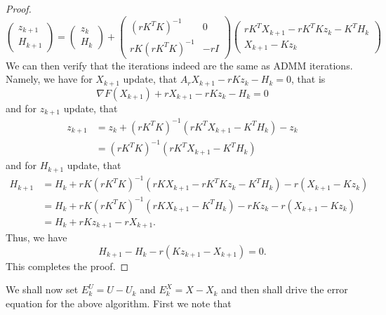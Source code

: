\begin{proof}
\begin{equation}
    \begin{pmatrix}
    z_{k+1}\\
    H_{k+1}
    \end{pmatrix} = \begin{pmatrix}
    z_{k}\\H_{k}
    \end{pmatrix} + \begin{pmatrix}
    (r K^T K)^{-1} & 0 \\
   r K (r K^T K)^{-1} & -r I
    \end{pmatrix} \begin{pmatrix}
     r K^T X_{k+1} - r K^T K z_k - K^T H_k\\
     X_{k+1} - Kz_k
    \end{pmatrix}
\end{equation}
We can then verify that the iterations indeed are the same as ADMM iterations. Namely, we have for $X_{k+1}$ update, that $A_r X_{k+1} - r Kz_{k} - H_k = 0 $, that is 
\begin{equation}
\nabla F(X_{k+1}) + r X_{k+1} - r K z_k - H_k = 0
\end{equation}
and for $z_{k+1}$ update, that \begin{equation}
\begin{aligned}
z_{k+1} &= z_k + (r K^T K)^{-1} (r K^T X_{k+1} - K^T H_k) - z_k \\
& = (r K^T K)^{-1} (r K^T X_{k+1} - K^T H_k)
\end{aligned}
\end{equation}
and for $H_{k+1}$ update, that  \begin{equation}
\begin{aligned}
H_{k+1} & = H_k +  r K(r K^T K )^{-1}\left( r K X_{k+1} - r K^T K z_k - K^T H_k \right) -r (X_{k+1} - Kz_k) \\
                & = H_k + r K(r K^T K )^{-1} (r K X_{k+1} - K^T H_k) - r K z_k - r (X_{k+1} - Kz_k) \\
                & = H_k +r K z_{k+1} -r X_{k+1}.
\end{aligned}
\end{equation}
Thus, we have 
\begin{equation}
H_{k+1} - H_k -r(Kz_{k+1} - X_{k+1})=0.
\end{equation}
This completes the proof. 
\end{proof}
We shall now set $E_k^U = U - U_k$ and $E_k^X = X - X_k$ and then shall drive the error equation for the above algorithm. First we note that 

